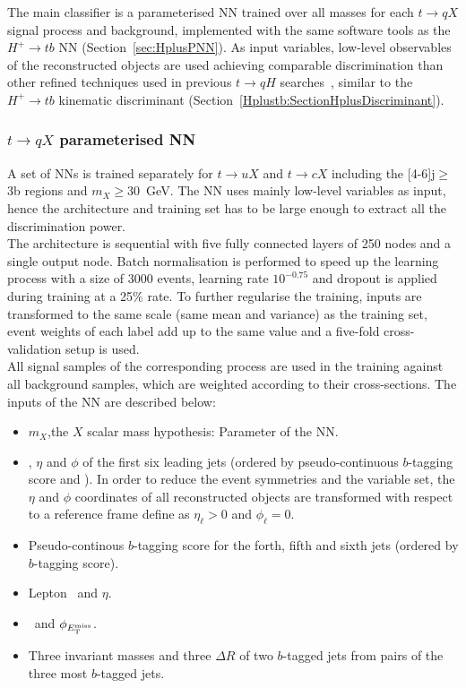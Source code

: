 The main classifier is a parameterised NN trained over all masses for each $t\to qX$ signal process and background, implemented with the same software tools as the $H^+\to tb$ NN (Section~\ref{sec:HplusPNN}). As input variables, low-level observables of the reconstructed objects are used achieving comparable discrimination than other refined techniques used in previous $t\to qH$ searches~\cite{TOPQ-2017-07}, similar to the $H^+\to tb$ kinematic discriminant (Section~\ref{Hplustb:SectionHplusDiscriminant}).

\subsubsection{$t\to qX$ parameterised NN}

A set of NNs is trained separately for $t\to uX$ and $t\to cX$ including the [4-6]j$\geq$3b regions and $m_X\geq$30~GeV. The NN uses mainly low-level variables as input, hence the architecture and training set has to be large enough to extract all the discrimination power.\\

The architecture is sequential with five fully connected layers of 250 nodes and a single output node. Batch normalisation is performed to speed up the learning process with a size of 3000 events, learning rate $10^{-0.75}$ and dropout is applied during training at a 25\% rate. To further regularise the training, inputs are transformed to the same scale (same mean and variance) as the training set, event weights of each label add up to the same value and a five-fold cross-validation setup is used.\\

All signal samples of the corresponding process are used in the training against all background samples, which are weighted according to their cross-sections. The inputs of the NN are described below:

\begin{itemize}
    \item $m_X$,the $X$ scalar mass hypothesis: Parameter of the NN.
    \item \pT, $\eta$ and $\phi$ of the first six leading jets (ordered by pseudo-continuous $b$-tagging score and \pT). In order to reduce the event symmetries and the variable set, the $\eta$ and $\phi$ coordinates of all reconstructed objects are transformed with respect to a reference frame define as $\eta_{\ell}>0$ and $\phi_{\ell}=0$.
    \item Pseudo-continous $b$-tagging score for the forth, fifth and sixth jets (ordered by $b$-tagging score).
    \item Lepton \pT\ and $\eta$.
    \item \MET\ and $\phi_{E_{\text{T}}^{\text{miss}}}$.
    \item Three invariant masses and three $\Delta R$ of two $b$-tagged jets from pairs of the three most $b$-tagged jets. 
\end{itemize}

